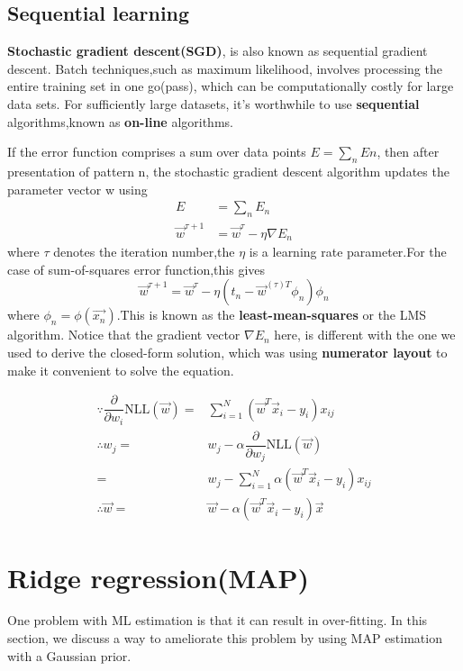 \subsection{Sequential learning}
\textbf{Stochastic gradient descent(SGD)}, is also known as sequential gradient descent. 
Batch techniques,such as maximum likelihood, involves processing the entire training set in one go(pass), which can be computationally costly for large data sets. For sufficiently large datasets, it's worthwhile to use \textbf{sequential} algorithms,known as \textbf{on-line} algorithms.

If the error function comprises a sum over data points $E = \sum_n En$, then after presentation of pattern n, the stochastic gradient descent algorithm updates the parameter vector w using
\begin{align}
E &=\sum_{n}E_n \\
\vec{w}^{\tau+1} &= \vec{w}^{\tau}-\eta\nabla E_n
\end{align}
where $\tau$ denotes the iteration number,the $\eta$ is a learning rate parameter.For the case of sum-of-squares error function,this gives
\begin{equation}
\vec{w}^{\tau+1} = \vec{w}^{\tau}-\eta(t_n-\vec{w}^{(\tau)T}\phi_n)\phi_n
\end{equation}
where $\phi_n=\phi(\vec{x_n})$.This is known as the \textbf{least-mean-squares} or the LMS algorithm.
Notice that the gradient vector $\nabla{E_n}$ here, is different with the one we used to derive the closed-form solution, which was using \textbf{numerator layout} to make it convenient to solve the equation.

\begin{align}
\because \dfrac{\partial}{\partial w_i}\text{NLL}(\vec{w})=& \sum\limits_{i=1}^N (\vec{w}^T\vec{x}_i-y_i)x_{ij} \\
\therefore w_j=& w_j - \alpha\dfrac{\partial}{\partial w_j}\text{NLL}(\vec{w}) \nonumber \\
                  =& w_j - \sum\limits_{i=1}^N \alpha(\vec{w}^T\vec{x}_i-y_i)x_{ij} \\
\therefore \vec{w}=& \vec{w}-\alpha(\vec{w}^T\vec{x}_i-y_i)\vec{x}
\end{align}


\section{Ridge regression(MAP)}
One problem with ML estimation is that it can result in over-fitting. In this section, we discuss a way to ameliorate this problem by using MAP estimation with a Gaussian prior.

